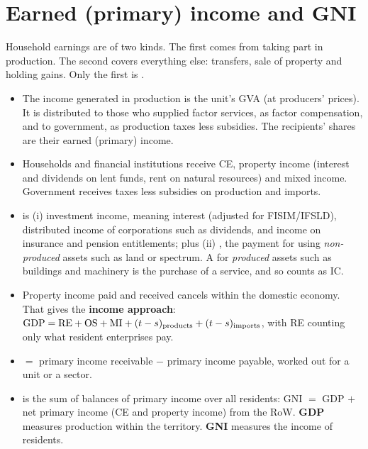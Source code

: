 \section{Earned (primary) income and GNI}\label{sec:gni}

Household earnings are of two kinds. The first comes from taking part in production. The second
covers everything else: transfers, sale of property and holding gains. Only the first is
.

\begin{itemize}
\item {} The income generated in production is the unit's GVA (at producers'
  prices). It is distributed to those who supplied factor services, as factor compensation, and
  to government, as production taxes less subsidies. The recipients' shares are their earned
  (primary) income.
\item {} Households and financial institutions receive CE, property income
  (interest and dividends on lent funds, rent on natural resources) and mixed income. Government
  receives taxes less subsidies on production and imports.
\item {} is (i) investment income, meaning interest (adjusted for FISIM/IFSLD),
  distributed income of corporations such as dividends, and income on insurance and pension
  entitlements; plus (ii) , the payment for using \emph{non-produced} assets such as land
  or spectrum. A  for \emph{produced} assets such as buildings and machinery is the
  purchase of a service, and so counts as IC.
\item Property income paid and received cancels within the domestic economy. That gives the
  \textbf{income approach}: $\mathrm{GDP}=\mathrm{RE}+\mathrm{OS}+\mathrm{MI}+(t-s)_{\text{products}}+(t-s)_{\text{imports}}$,
  with RE counting only what resident enterprises pay.
\item {} $=$ primary income receivable $-$ primary income payable,
  worked out for a unit or a sector.
\item {} is the sum of balances of primary income over all residents:
  GNI $=$ GDP $+$ net primary income (CE and property income) from the RoW. \textbf{GDP} measures
  production within the territory. \textbf{GNI} measures the income of residents.
\end{itemize}

